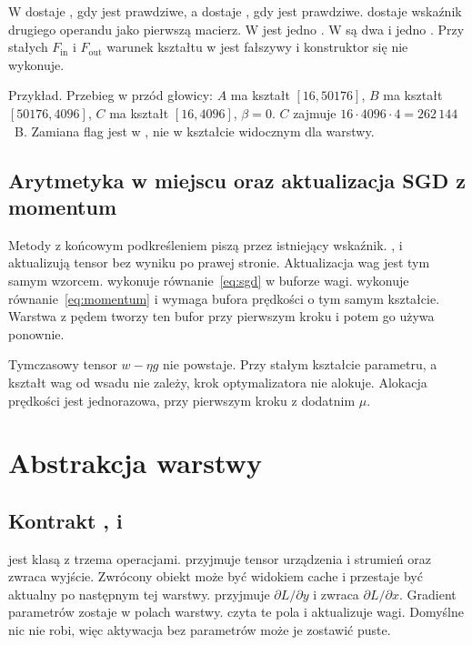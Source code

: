 W   dostaje , gdy  jest prawdziwe, a  dostaje , gdy  jest prawdziwe.  dostaje wskaźnik drugiego operandu jako pierwszą macierz. W  jest jedno . W  są dwa  i jedno . Przy stałych \(F_{\mathrm{in}}\) i \(F_{\mathrm{out}}\) warunek kształtu w  jest fałszywy i konstruktor się nie wykonuje.

Przykład. Przebieg w przód głowicy: \(A\) ma kształt \([16, 50176]\), \(B\) ma kształt \([50176, 4096]\), \(C\) ma kształt \([16, 4096]\), \(\beta = 0\). \(C\) zajmuje \(16 \cdot 4096 \cdot 4 = 262\,144\)~B. Zamiana flag jest w , nie w kształcie widocznym dla warstwy.

\subsection{Arytmetyka w miejscu oraz aktualizacja SGD z momentum}

Metody z końcowym podkreśleniem piszą przez istniejący wskaźnik. ,  i  aktualizują tensor bez wyniku po prawej stronie. Aktualizacja wag jest tym samym wzorcem.  wykonuje równanie~\eqref{eq:sgd} w buforze wagi.  wykonuje równanie~\eqref{eq:momentum} i wymaga bufora prędkości o tym samym kształcie. Warstwa z pędem tworzy ten bufor przy pierwszym kroku i potem go używa ponownie.

Tymczasowy tensor \(w - \eta g\) nie powstaje. Przy stałym kształcie parametru, a kształt wag od wsadu nie zależy, krok optymalizatora nie alokuje. Alokacja prędkości jest jednorazowa, przy pierwszym kroku z dodatnim \(\mu\).

\section{Abstrakcja warstwy}

\subsection{Kontrakt ,  i }

 jest klasą z trzema operacjami.  przyjmuje tensor urządzenia i strumień oraz zwraca wyjście. Zwrócony obiekt może być widokiem cache i przestaje być aktualny po następnym  tej warstwy.  przyjmuje \(\partial L / \partial y\) i zwraca \(\partial L / \partial x\). Gradient parametrów zostaje w polach warstwy.  czyta te pola i aktualizuje wagi. Domyślne  nic nie robi, więc aktywacja bez parametrów może je zostawić puste.

